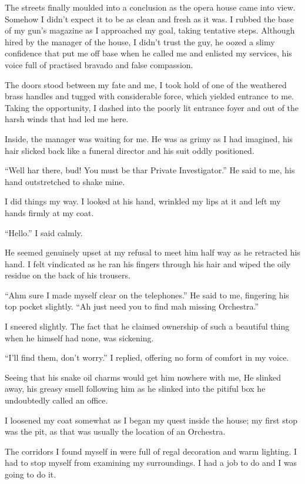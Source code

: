 The streets finally moulded into a conclusion as the opera house
came into view. Somehow I didn't expect it to be as clean and
fresh as it was. I rubbed the base of my gun's magazine as I
approached my goal, taking tentative steps. Although hired by the
manager of the house, I didn't trust the guy, he oozed a
slimy confidence that put me off base when he called me and
enlisted my services, his voice full of practised bravado and false
compassion.



The doors stood between my fate and me, I took hold of one of the
weathered brass handles and tugged with considerable force, which
yielded entrance to me. Taking the opportunity, I dashed into the
poorly lit entrance foyer and out of the harsh winds that had led
me here.

Inside, the manager was waiting for me. He was as grimy as I had
imagined, his hair slicked back like a funeral director and his
suit oddly positioned.

``Well har there, bud! You must be thar Private
Investigator.'' He said to me, his hand outstretched to shake
mine.

I did things my way. I looked at his hand, wrinkled my lips at it
and left my hands firmly at my coat.

``Hello.'' I said calmly.

He seemed genuinely upset at my refusal to meet him half way as he
retracted his hand. I felt vindicated as he ran his fingers through
his hair and wiped the oily residue on the back of his
trousers.

``Ahm sure I made myself clear on the telephones.'' He
said to me, fingering his top pocket slightly. ``Ah just need
you to find mah missing Orchestra.''

I sneered slightly. The fact that he claimed ownership of such a
beautiful thing when he himself had none, was sickening.

``I'll find them, don't worry.'' I replied,
offering no form of comfort in my voice.

Seeing that his snake oil charms would get him nowhere with me, He
slinked away, his greasy smell following him as he slinked into the
pitiful box he undoubtedly called an office.



I loosened my coat somewhat as I began my quest inside the house;
my first stop was the pit, as that was usually the location of an
Orchestra.

The corridors I found myself in were full of regal decoration and
warm lighting. I had to stop myself from examining my surroundings.
I had a job to do and I was going to do it.



